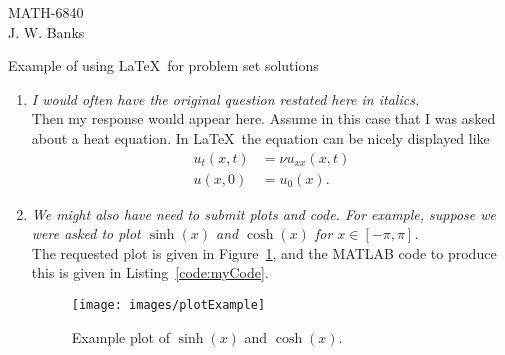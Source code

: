 \documentclass[11pt]{article}
\begin{document}
\begin{flushright}
\small{MATH-6840\\
J. W. Banks}
\end{flushright}

\begin{center}
\large{Example of using \LaTeX ~for problem set solutions}\\
\end{center}

\begin{enumerate}
  \item {\color{blue} \em I would often have the original question restated here in italics.}\\
  
  Then my response would appear here. Assume in this case that I was asked about a heat equation. In \LaTeX ~the equation can be nicely displayed like
\begin{align*}
  u_t(x,t) & =\nu u_{xx}(x,t)\\
  u(x,0) & = u_0(x).
\end{align*}


\item {\color{blue} \em We might also have need to submit plots and code. For example, suppose we were asked to plot $\sinh(x)$ and $\cosh(x)$ for $x\in[-\pi,\pi]$.}\\

The requested plot is given in Figure~\ref{fig:example}, and the MATLAB code to produce this is given in Listing~\ref{code:myCode}.
\begin{figure}[hbt]
  \begin{center}
  \texttt{[image: images/plotExample]}
  \caption{Example plot of $\sinh(x)$ and $\cosh(x)$.}
  \label{fig:example}
  \end{center}
\end{figure}



\end{enumerate}
\end{document}
